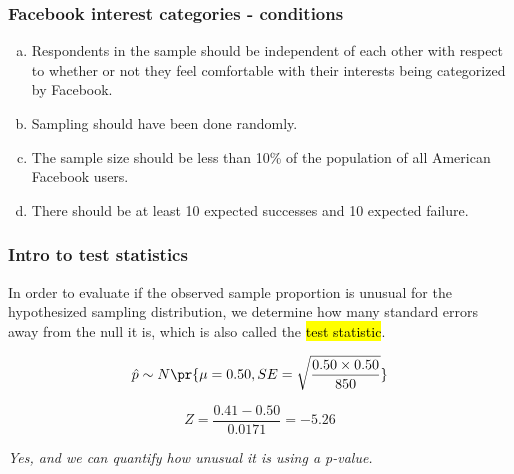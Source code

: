 \documentclass[t,compress,mathserif]{beamer}
\newcommand{\soln}[1]{\textit{#1}}
\begin{document}
\begin{frame}
\frametitle{Facebook interest categories - conditions}


\begin{enumerate}[(a)]
\item Respondents in the sample should be independent of each other with respect to whether or not they feel comfortable with their interests being categorized by Facebook.
\item Sampling should have been done randomly.
\item The sample size should be less than 10\% of the population of all American Facebook users.
\item There should be at least 10 expected successes and 10 expected failure.
\end{enumerate}

\end{frame}


\begin{frame}
\frametitle{Intro to test statistics}

In order to evaluate if the observed sample proportion is unusual for the hypothesized sampling distribution, we determine how many standard errors away from the null it is, which is also called the \hl{test statistic}.

\pause

\[ \hat{p} \sim N \pr{ \mu = 0.50, SE = \sqrt{\frac{0.50 \times 0.50}{850} }  } \]

\pause

\[ Z = \frac{0.41 - 0.50}{0.0171} = -5.26 \]

 \pause


\pause

\soln{Yes, and we can quantify how unusual it is using a p-value.}

\end{frame}

\end{document}
